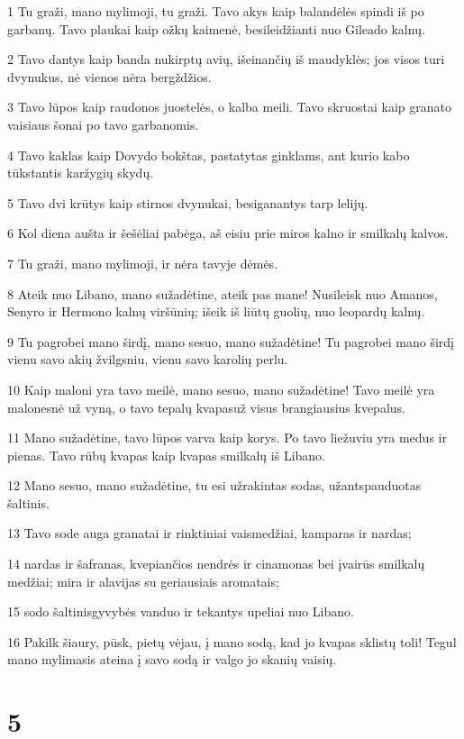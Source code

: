 \par 1 Tu graži, mano mylimoji, tu graži. Tavo akys kaip balandėlės spindi iš po garbanų. Tavo plaukai kaip ožkų kaimenė, besileidžianti nuo Gileado kalnų. 
\par 2 Tavo dantys kaip banda nukirptų avių, išeinančių iš maudyklės; jos visos turi dvynukus, nė vienos nėra bergždžios. 
\par 3 Tavo lūpos kaip raudonos juostelės, o kalba meili. Tavo skruostai kaip granato vaisiaus šonai po tavo garbanomis. 
\par 4 Tavo kaklas kaip Dovydo bokštas, pastatytas ginklams, ant kurio kabo tūkstantis karžygių skydų. 
\par 5 Tavo dvi krūtys kaip stirnos dvynukai, besiganantys tarp lelijų. 
\par 6 Kol diena aušta ir šešėliai pabėga, aš eisiu prie miros kalno ir smilkalų kalvos. 
\par 7 Tu graži, mano mylimoji, ir nėra tavyje dėmės. 
\par 8 Ateik nuo Libano, mano sužadėtine, ateik pas mane! Nusileisk nuo Amanos, Senyro ir Hermono kalnų viršūnių; išeik iš liūtų guolių, nuo leopardų kalnų. 
\par 9 Tu pagrobei mano širdį, mano sesuo, mano sužadėtine! Tu pagrobei mano širdį vienu savo akių žvilgsniu, vienu savo karolių perlu. 
\par 10 Kaip maloni yra tavo meilė, mano sesuo, mano sužadėtine! Tavo meilė yra malonesnė už vyną, o tavo tepalų kvapas­už visus brangiausius kvepalus. 
\par 11 Mano sužadėtine, tavo lūpos varva kaip korys. Po tavo liežuviu yra medus ir pienas. Tavo rūbų kvapas kaip kvapas smilkalų iš Libano. 
\par 12 Mano sesuo, mano sužadėtine, tu esi užrakintas sodas, užantspauduotas šaltinis. 
\par 13 Tavo sode auga granatai ir rinktiniai vaismedžiai, kamparas ir nardas; 
\par 14 nardas ir šafranas, kvepiančios nendrės ir cinamonas bei įvairūs smilkalų medžiai; mira ir alavijas su geriausiais aromatais; 
\par 15 sodo šaltinis­gyvybės vanduo ir tekantys upeliai nuo Libano. 
\par 16 Pakilk šiaury, pūsk, pietų vėjau, į mano sodą, kad jo kvapas sklistų toli! Tegul mano mylimasis ateina į savo sodą ir valgo jo skanių vaisių.



\chapter{5}


